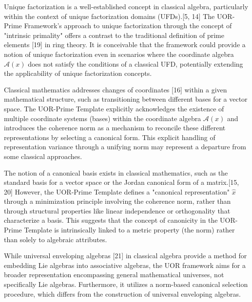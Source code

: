 \documentclass{article}
\begin{document}
Unique factorization is a well-established concept in classical algebra, particularly within the context of unique factorization domains (UFDs).[5, 14] The UOR-Prime Framework's approach to unique factorization through the concept of "intrinsic primality" offers a contrast to the traditional definition of prime elements [19] in ring theory. It is conceivable that the framework could provide a notion of unique factorization even in scenarios where the coordinate algebra $\mathcal{A}(x)$ does not satisfy the conditions of a classical UFD, potentially extending the applicability of unique factorization concepts.

Classical mathematics addresses changes of coordinates [16] within a given mathematical structure, such as transitioning between different bases for a vector space. The UOR-Prime Template explicitly acknowledges the existence of multiple coordinate systems (bases) within the coordinate algebra $\mathcal{A}(x)$ and introduces the coherence norm as a mechanism to reconcile these different representations by selecting a canonical form. This explicit handling of representation variance through a unifying norm may represent a departure from some classical approaches.

The notion of a canonical basis exists in classical mathematics, such as the standard basis for a vector space or the Jordan canonical form of a matrix.[15, 20] However, the UOR-Prime Template defines a "canonical representation" $\hat{x}$ through a minimization principle involving the coherence norm, rather than through structural properties like linear independence or orthogonality that characterize a basis. This suggests that the concept of canonicity in the UOR-Prime Template is intrinsically linked to a metric property (the norm) rather than solely to algebraic attributes.

While universal enveloping algebras [21] in classical algebra provide a method for embedding Lie algebras into associative algebras, the UOR framework aims for a broader representation encompassing general mathematical universes, not specifically Lie algebras. Furthermore, it utilizes a norm-based canonical selection procedure, which differs from the construction of universal enveloping algebras.
\end{document}
